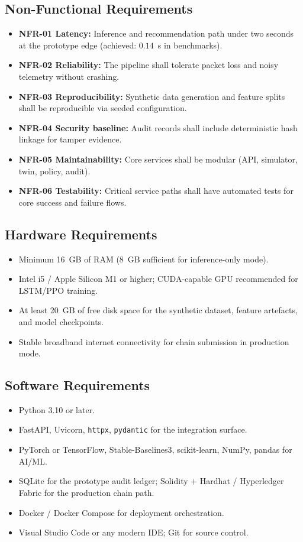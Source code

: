 \documentclass[12pt,a4paper,oneside]{report}
\begin{document}
\subsection{Non-Functional Requirements}
\begin{itemize}[leftmargin=*]
  \item \textbf{NFR-01 Latency:} Inference and recommendation path under two seconds at the prototype edge (achieved: $0.14$~s in benchmarks).
  \item \textbf{NFR-02 Reliability:} The pipeline shall tolerate packet loss and noisy telemetry without crashing.
  \item \textbf{NFR-03 Reproducibility:} Synthetic data generation and feature splits shall be reproducible via seeded configuration.
  \item \textbf{NFR-04 Security baseline:} Audit records shall include deterministic hash linkage for tamper evidence.
  \item \textbf{NFR-05 Maintainability:} Core services shall be modular (API, simulator, twin, policy, audit).
  \item \textbf{NFR-06 Testability:} Critical service paths shall have automated tests for core success and failure flows.
\end{itemize}

\subsection{Hardware Requirements}
\begin{itemize}[leftmargin=*]
  \item Minimum 16~GB of RAM (8~GB sufficient for inference-only mode).
  \item Intel i5 / Apple Silicon M1 or higher; CUDA-capable GPU recommended for LSTM/PPO training.
  \item At least 20~GB of free disk space for the synthetic dataset, feature artefacts, and model checkpoints.
  \item Stable broadband internet connectivity for chain submission in production mode.
\end{itemize}

\subsection{Software Requirements}
\begin{itemize}[leftmargin=*]
  \item Python 3.10 or later.
  \item FastAPI, Uvicorn, \texttt{httpx}, \texttt{pydantic} for the integration surface.
  \item PyTorch or TensorFlow, Stable-Baselines3, scikit-learn, NumPy, pandas for AI/ML.
  \item SQLite for the prototype audit ledger; Solidity + Hardhat / Hyperledger Fabric for the production chain path.
  \item Docker / Docker Compose for deployment orchestration.
  \item Visual Studio Code or any modern IDE; Git for source control.
\end{itemize}
\end{document}
